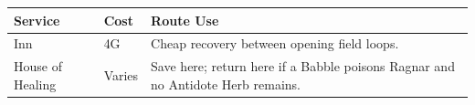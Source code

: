 \documentclass[
  american,
  10pt,
  letterpaper,
  oneside,
  open=any]{scrreprt}
\newcounter{none} %
\newenvironment{guidetable}{%
  \small\setstretch{1.0}%
  \setlength{\tabcolsep}{4pt}%
  \setlength{\LTpre}{8pt}\setlength{\LTpost}{10pt}%
  \renewcommand{\arraystretch}{1.16}%
}{ }
\begin{document}
\begin{guidetable}

{\def\LTcaptype{none} %
\begin{longtable}[]{@{}
  >{\raggedright\arraybackslash}p{}
  >{\raggedleft\arraybackslash}p{}
  >{\raggedright\arraybackslash}p{}@{}}
\toprule\noalign{}
\begin{minipage}[b]{\linewidth}\raggedright
\color{GuideGreen}\bfseries Service
\end{minipage} & \begin{minipage}[b]{\linewidth}\raggedleft
\color{GuideGreen}\bfseries Cost
\end{minipage} & \begin{minipage}[b]{\linewidth}\raggedright
\color{GuideGreen}\bfseries Route Use
\end{minipage} \\
\midrule\noalign{}
\endhead
\bottomrule\noalign{}
\endlastfoot
Inn & 4G & Cheap recovery between opening field loops. \\
House of Healing & Varies & Save here; return here if a Babble poisons
Ragnar and no Antidote Herb remains. \\
\end{longtable}
}

\end{guidetable}
\end{document}
